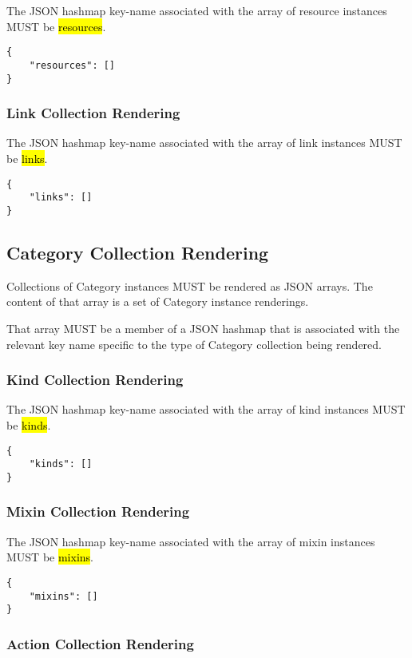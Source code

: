 \documentclass[10pt,a4paper]{article}
\begin{document}
The JSON hashmap key-name associated with the array of resource instances MUST be \hl{resources}.

\begin{lstlisting}
{
    "resources": []
}
\end{lstlisting}

\subsubsection{Link Collection Rendering}

The JSON hashmap key-name associated with the array of link instances MUST be \hl{links}.

\begin{lstlisting}
{
    "links": []
}
\end{lstlisting}

\subsection{Category Collection Rendering}
Collections of Category instances MUST be rendered as JSON arrays. The content of that array
is a set of Category instance renderings.

That array MUST be a member of a JSON hashmap that is associated with the relevant key name
specific to the type of Category collection being rendered.


\subsubsection{Kind Collection Rendering}

The JSON hashmap key-name associated with the array of kind instances MUST be \hl{kinds}.

\begin{lstlisting}
{
    "kinds": []
}
\end{lstlisting}

\subsubsection{Mixin Collection Rendering}

The JSON hashmap key-name associated with the array of mixin instances MUST be \hl{mixins}.

\begin{lstlisting}
{
    "mixins": []
}
\end{lstlisting}

\subsubsection{Action Collection Rendering}
\end{document}
